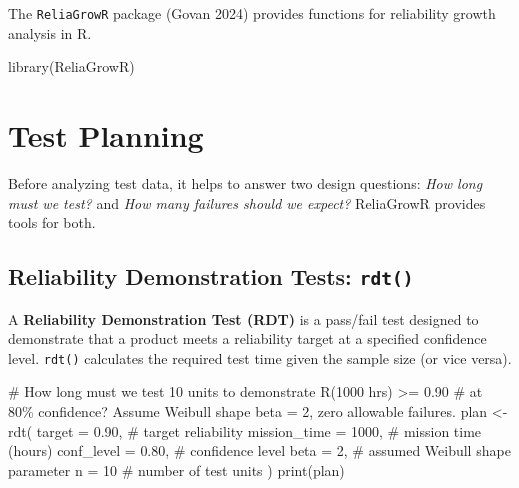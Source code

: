 \documentclass[
  letterpaper,
  DIV=11,
  numbers=noendperiod]{scrreprt}
\newenvironment{Shaded}{\begin{snugshade}}{\end{snugshade}}
\newcommand{\AttributeTok}[1]{\textcolor[rgb]{0.40,0.45,0.13}{#1}}
\newcommand{\CommentTok}[1]{\textcolor[rgb]{0.37,0.37,0.37}{#1}}
\newcommand{\DecValTok}[1]{\textcolor[rgb]{0.68,0.00,0.00}{#1}}
\newcommand{\FloatTok}[1]{\textcolor[rgb]{0.68,0.00,0.00}{#1}}
\newcommand{\FunctionTok}[1]{\textcolor[rgb]{0.28,0.35,0.67}{#1}}
\newcommand{\NormalTok}[1]{\textcolor[rgb]{0.00,0.23,0.31}{#1}}
\newcommand{\OtherTok}[1]{\textcolor[rgb]{0.00,0.23,0.31}{#1}}
\begin{document}
The \texttt{ReliaGrowR} package (Govan 2024) provides functions for
reliability growth analysis in R.

\begin{Shaded}
\begin{Highlighting}[]
\FunctionTok{library}\NormalTok{(ReliaGrowR)}
\end{Highlighting}
\end{Shaded}

\section{Test Planning}\label{test-planning}

Before analyzing test data, it helps to answer two design questions:
\emph{How long must we test?} and \emph{How many failures should we
expect?} ReliaGrowR provides tools for both.

\subsection{\texorpdfstring{Reliability Demonstration Tests:
\texttt{rdt()}}{Reliability Demonstration Tests: rdt()}}\label{reliability-demonstration-tests-rdt}

A \textbf{Reliability Demonstration Test (RDT)} is a pass/fail test
designed to demonstrate that a product meets a reliability target at a
specified confidence level. \texttt{rdt()} calculates the required test
time given the sample size (or vice versa).

\begin{Shaded}
\begin{Highlighting}[]
\CommentTok{\# How long must we test 10 units to demonstrate R(1000 hrs) \textgreater{}= 0.90}
\CommentTok{\# at 80\% confidence? Assume Weibull shape beta = 2, zero allowable failures.}
\NormalTok{plan }\OtherTok{\textless{}{-}} \FunctionTok{rdt}\NormalTok{(}
  \AttributeTok{target       =} \FloatTok{0.90}\NormalTok{,   }\CommentTok{\# target reliability}
  \AttributeTok{mission\_time =} \DecValTok{1000}\NormalTok{,   }\CommentTok{\# mission time (hours)}
  \AttributeTok{conf\_level   =} \FloatTok{0.80}\NormalTok{,   }\CommentTok{\# confidence level}
  \AttributeTok{beta         =} \DecValTok{2}\NormalTok{,      }\CommentTok{\# assumed Weibull shape parameter}
  \AttributeTok{n            =} \DecValTok{10}      \CommentTok{\# number of test units}
\NormalTok{)}
\FunctionTok{print}\NormalTok{(plan)}
\end{Highlighting}
\end{Shaded}
\end{document}
